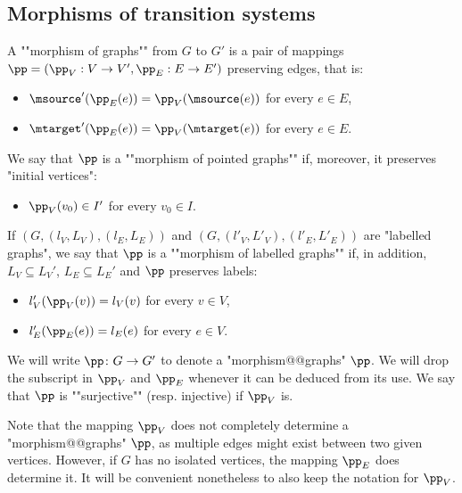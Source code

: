 \documentclass[10pt,a4paper]{amsart}
\begin{document}
\subsection{Morphisms of transition systems}\label{subsec:morphisms-TS}


\begin{definition}\label{def:morphism_graphs}
	\AP A ""morphism of graphs"" from $G$ to $G'$ is a pair of mappings $\pp = (\pp_V: V \rightarrow V', \pp_E: E \rightarrow E')$ preserving edges, that is:
	\begin{itemize}
		\item $\msource'(\pp_E(e))=\pp_V(\msource(e))$ for every $e\in E$,
			
		\item $\mtarget'(\pp_E(e))=\pp_V(\mtarget(e))$ for every $e\in E$.
	\end{itemize}			
	\AP We say that $\pp$ is a ""morphism of pointed graphs"" if, moreover, it preserves "initial vertices":
	\begin{itemize}
		\item $\pp_V(v_0)\in I'$ for every $v_0\in I$. %
	\end{itemize}
	\AP If $(G,(l_V,L_V),(l_E,L_E))$ and $(G,(l'_V,L'_V),(l'_E,L'_E))$ are "labelled graphs", we say that $\pp$ is a ""morphism of labelled graphs"" if, in addition, $L_V \subseteq L_V'$, $L_E \subseteq L_E'$ and $\pp$ preserves labels:
\begin{itemize}
	\item $l_V'(\pp_V(v))=l_V(v)$ for every $v\in V$,
	
	\item $l_E'(\pp_E(e))=l_E(e)$ for every $e\in V$. 
\end{itemize}
\end{definition}



We will write $\pp\colon G \to G'$ to denote a "morphism@@graphs" $\pp$. We will drop the subscript in $\pp_V$ and $\pp_E$ whenever it can be deduced from its use.
\AP We say that $\pp$ is ""surjective"" (resp. injective) if $\pp_V$ is.

Note that the mapping $\pp_V$ does not completely determine a "morphism@@graphs" $\pp$, as multiple edges might exist between two given vertices. However, if $G$ has no isolated vertices, the mapping $\pp_E$ does determine it. It will be convenient nonetheless to also keep the notation for $\pp_V$.
\end{document}
